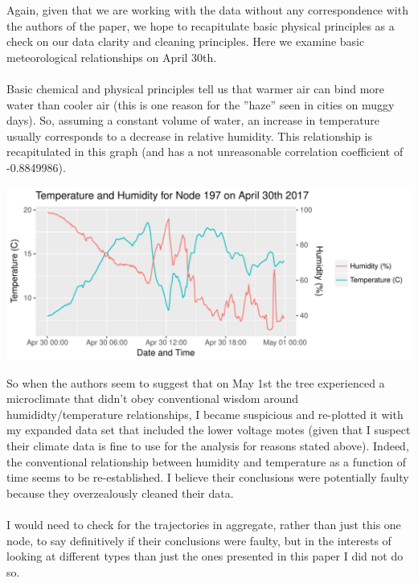 \documentclass[english]{article}\usepackage[]{graphicx}\usepackage[]{color}
\makeatletter
\def\maxwidth{ %
  \ifdim\Gin@nat@width>\linewidth
    \linewidth
  \else
    \Gin@nat@width
  \fi
}
\newenvironment{knitrout}{}{} %
\makeatother
\begin{document}
Again, given that we are working with the data without any correspondence
with the authors of the paper, we hope to recapitulate basic physical principles 
as a check on our data clarity and cleaning principles.  Here we examine basic meteorological relationships on April 30th.\\\\
Basic chemical and physical principles tell us that warmer air can bind more
water than cooler air (this is one reason for the ''haze'' seen in cities on muggy days).
So, assuming a constant volume of water, an increase in temperature usually
corresponds to a decrease in relative humidity.  This relationship is recapitulated
in this graph (and has a not unreasonable correlation coefficient of 
-0.8849986).\\

\begin{knitrout}
\color{fgcolor}

{\centering \includegraphics[width=\maxwidth]{figure/q2-1} 

}



\end{knitrout}

So when the authors seem to suggest that on May 1st the tree experienced a microclimate that
didn't obey conventional wisdom around humididty/temperature relationships, I became suspicious and re-plotted it with my expanded
data set that included the lower voltage motes (given that I suspect their climate data is
fine to use for the analysis for reasons stated above).  Indeed, the conventional relationship
between humidity and temperature as a function of time seems to be re-established.  I believe
their conclusions were potentially faulty because they overzealously cleaned their data.\\\\
I would need to check for the trajectories in aggregate, rather than just this one node, to say
definitively if their conclusions were faulty, but in the interests of looking at different types
than just the ones presented in this paper I did not do so.
\end{document}
